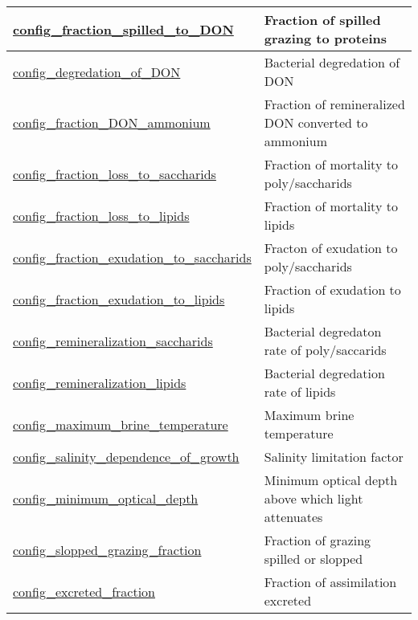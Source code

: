 {\begin{center}
\begin{longtable}{| p{2.0in} || p{4.0in} |}
    \hline
    \hyperref[subsec:nm_sec_config_fraction_spilled_to_DON]{config\_fraction\_spilled\_to\_\-DON} & Fraction of spilled grazing to proteins \\
    \hline
    \hyperref[subsec:nm_sec_config_degredation_of_DON]{config\_degredation\_of\_DON} & Bacterial degredation of DON \\
    \hline
    \hyperref[subsec:nm_sec_config_fraction_DON_ammonium]{config\_fraction\_DON\_\-ammonium} & Fraction of remineralized DON converted to ammonium \\
    \hline
    \hyperref[subsec:nm_sec_config_fraction_loss_to_saccharids]{config\_fraction\_loss\_to\_\-saccharids} & Fraction of mortality to poly/saccharids \\
    \hline
    \hyperref[subsec:nm_sec_config_fraction_loss_to_lipids]{config\_fraction\_loss\_to\_lipids} & Fraction of mortality to lipids \\
    \hline
    \hyperref[subsec:nm_sec_config_fraction_exudation_to_saccharids]{config\_fraction\_exudation\_to\_\-saccharids} & Fracton of exudation to poly/saccharids \\
    \hline
    \hyperref[subsec:nm_sec_config_fraction_exudation_to_lipids]{config\_fraction\_exudation\_to\_\-lipids} & Fraction of exudation to lipids \\
    \hline
    \hyperref[subsec:nm_sec_config_remineralization_saccharids]{config\_remineralization\_\-saccharids} & Bacterial degredaton rate of poly/saccarids \\
    \hline
    \hyperref[subsec:nm_sec_config_remineralization_lipids]{config\_remineralization\_lipids} & Bacterial degredation rate of lipids \\
    \hline
    \hyperref[subsec:nm_sec_config_maximum_brine_temperature]{config\_maximum\_brine\_\-temperature} & Maximum brine temperature \\
    \hline
    \hyperref[subsec:nm_sec_config_salinity_dependence_of_growth]{config\_salinity\_dependence\_of\_\-growth} & Salinity limitation factor \\
    \hline
    \hyperref[subsec:nm_sec_config_minimum_optical_depth]{config\_minimum\_optical\_depth} & Minimum optical depth above which light attenuates \\
    \hline
    \hyperref[subsec:nm_sec_config_slopped_grazing_fraction]{config\_slopped\_grazing\_fraction} & Fraction of grazing spilled or slopped \\
    \hline
    \hyperref[subsec:nm_sec_config_excreted_fraction]{config\_excreted\_fraction} & Fraction of assimilation excreted \\

\end{longtable}
\end{center}}
